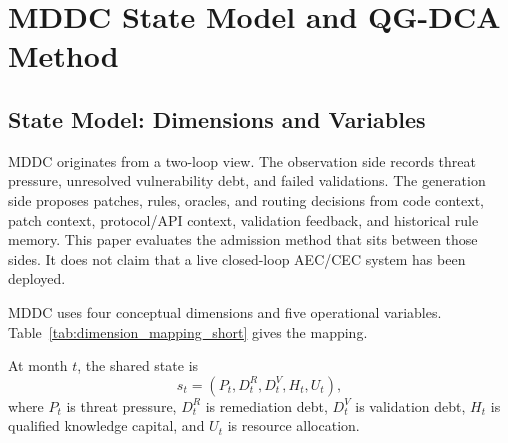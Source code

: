 ﻿\documentclass[lettersize,journal]{IEEEtran}
\begin{document}
\section{MDDC State Model and QG-DCA Method}
\subsection{State Model: Dimensions and Variables}
MDDC originates from a two-loop view. The observation side records threat pressure, unresolved vulnerability debt, and failed validations. The generation side proposes patches, rules, oracles, and routing decisions from code context, patch context, protocol/API context, validation feedback, and historical rule memory. This paper evaluates the admission method that sits between those sides. It does not claim that a live closed-loop AEC/CEC system has been deployed.

MDDC uses four conceptual dimensions and five operational variables. Table~\ref{tab:dimension_mapping_short} gives the mapping.

\begin{table}[!t]
\caption{MDDC conceptual dimensions and operational variables}
\label{tab:dimension_mapping_short}
\centering
\scriptsize
\renewcommand{\arraystretch}{1.15}
\end{table}

At month $t$, the shared state is
\begin{equation}
s_t = (P_t, D^R_t, D^V_t, H_t, U_t),
\end{equation}
where $P_t$ is threat pressure, $D^R_t$ is remediation debt, $D^V_t$ is validation debt, $H_t$ is qualified knowledge capital, and $U_t$ is resource allocation.
\end{document}
